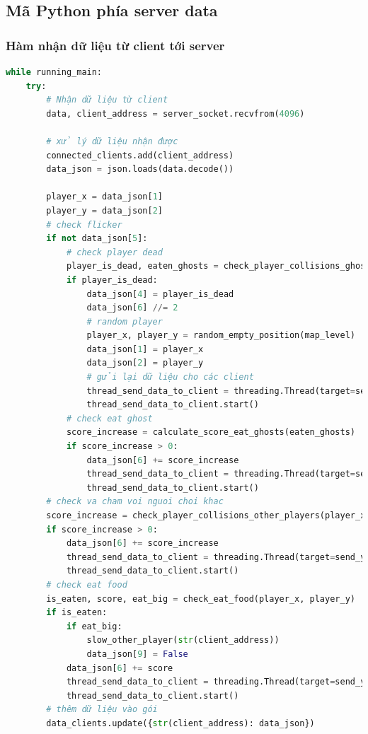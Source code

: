 \documentclass[a4paper]{article}
\begin{document}
\subsection{Mã Python phía server data}
\subsubsection{Hàm nhận dữ liệu từ client tới server}
\begin{lstlisting}[language=Python]
while running_main:
    try:
        # Nhận dữ liệu từ client
        data, client_address = server_socket.recvfrom(4096)

        # xử lý dữ liệu nhận được
        connected_clients.add(client_address)
        data_json = json.loads(data.decode())

        player_x = data_json[1]
        player_y = data_json[2]
        # check flicker
        if not data_json[5]:
            # check player dead
            player_is_dead, eaten_ghosts = check_player_collisions_ghosts(player_x, player_y)
            if player_is_dead:
                data_json[4] = player_is_dead
                data_json[6] //= 2
                # random player
                player_x, player_y = random_empty_position(map_level)
                data_json[1] = player_x
                data_json[2] = player_y
                # gửi lại dữ liệu cho các client
                thread_send_data_to_client = threading.Thread(target=send_you_data, args=({"you": data_json},client_address,))
                thread_send_data_to_client.start()
            # check eat ghost
            score_increase = calculate_score_eat_ghosts(eaten_ghosts)
            if score_increase > 0:
                data_json[6] += score_increase
                thread_send_data_to_client = threading.Thread(target=send_you_data,args=({"you": data_json}, client_address,))
                thread_send_data_to_client.start()
        # check va cham voi nguoi choi khac
        score_increase = check_player_collisions_other_players(player_x, player_y, str(client_address), data_json[9])
        if score_increase > 0:
            data_json[6] += score_increase
            thread_send_data_to_client = threading.Thread(target=send_you_data,args=({"you": data_json}, client_address,))
            thread_send_data_to_client.start()
        # check eat food
        is_eaten, score, eat_big = check_eat_food(player_x, player_y)
        if is_eaten:
            if eat_big:
                slow_other_player(str(client_address))
                data_json[9] = False
            data_json[6] += score
            thread_send_data_to_client = threading.Thread(target=send_you_data, args=({"you": data_json},client_address,))
            thread_send_data_to_client.start()
        # thêm dữ liệu vào gói
        data_clients.update({str(client_address): data_json})


\end{lstlisting}
\end{document}
